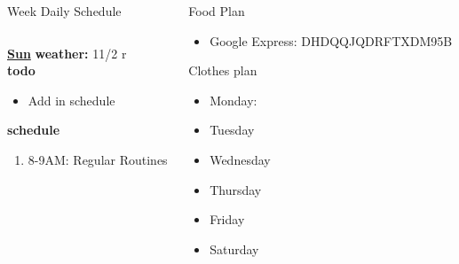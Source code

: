 \begin{columns}
\begin{column}{0.333\columnwidth}
\begin{columns}
\begin{column}{0.6\linewidth}
\begin{block}{Week Daily Schedule}
\begin{columns}
          \begin{column}{0.15\textwidth}{\small \underline{\bf Sun}}
            {\tiny {\bf weather:} } {\tiny 11/2 r} \\ 
            {\tiny {\bf todo}}\\
            \begin{itemize}
              \tiny \item \tiny Add in schedule
            \end{itemize} 
                {\tiny \bf schedule}\\
                \begin{enumerate} 
                  \tiny \item \tiny 8-9AM: Regular Routines 
                \end{enumerate}
          \end{column}
        \end{columns}
      \end{block}

\end{column}
    
    \begin{column}{0.20\linewidth}
      \begin{block}{Food Plan} 
        \begin{itemize}
          \tiny \item \tiny Google Express: DHDQQJQDRFTXDM95B
        \end{itemize}
      \end{block} 
      \begin{block}{Clothes plan} 
        \begin{itemize}
          \tiny \item \tiny Monday: 
        \item \tiny Tuesday
        \item \tiny Wednesday
        \item \tiny Thursday
        \item \tiny Friday
        \item \tiny Saturday
        \end{itemize} 
      \end{block} 
      

\end{column}
\end{columns}
\end{column}
\end{columns}
